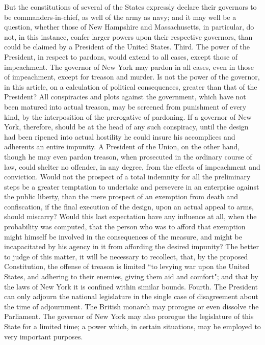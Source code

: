 But the constitutions of several of the States expressly declare their governors to be commanders-in-chief, as well of the army as navy; and it may well be a question, whether those of New Hampshire and Massachusetts, in particular, do not, in this instance, confer larger powers upon their respective governors, than could be claimed by a President of the United States. 
Third. 
The power of the President, in respect to pardons, would extend to all cases, except those of impeachment. 
The governor of New York may pardon in all cases, even in those of impeachment, except for treason and murder. 
Is not the power of the governor, in this article, on a calculation of political consequences, greater than that of the President? 
All conspiracies and plots against the government, which have not been matured into actual treason, may be screened from punishment of every kind, by the interposition of the prerogative of pardoning. 
If a governor of New York, therefore, should be at the head of any such conspiracy, until the design had been ripened into actual hostility he could insure his accomplices and adherents an entire impunity. 
A President of the Union, on the other hand, though he may even pardon treason, when prosecuted in the ordinary course of law, could shelter no offender, in any degree, from the effects of impeachment and conviction. 
Would not the prospect of a total indemnity for all the preliminary steps be a greater temptation to undertake and persevere in an enterprise against the public liberty, than the mere prospect of an exemption from death and confiscation, if the final execution of the design, upon an actual appeal to arms, should miscarry? 
Would this last expectation have any influence at all, when the probability was computed, that the person who was to afford that exemption might himself be involved in the consequences of the measure, and might be incapacitated by his agency in it from affording the desired impunity? 
The better to judge of this matter, it will be necessary to recollect, that, by the proposed Constitution, the offense of treason is limited ``to levying war upon the United States, and adhering to their enemies, giving them aid and comfort"; and that by the laws of New York it is confined within similar bounds. 
Fourth. 
The President can only adjourn the national legislature in the single case of disagreement about the time of adjournment. 
The British monarch may prorogue or even dissolve the Parliament. 
The governor of New York may also prorogue the legislature of this State for a limited time; a power which, in certain situations, may be employed to very important purposes.

